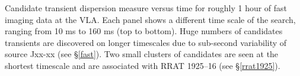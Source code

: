 Candidate transient dispersion measure versus time for roughly 1 hour of fast imaging data at the VLA. Each panel shows a different time scale of the search, ranging from 10 ms to 160 ms (top to bottom). Huge numbers of candidates transients are discovered on longer timescales due to sub-second variability of source Jxx-xx (see \S \ref{fast}). Two small clusters of candidates are seen at the shortest timescale and are associated with RRAT 1925--16 (see \S \ref{rrat1925}).

\label{fig:dmt}
